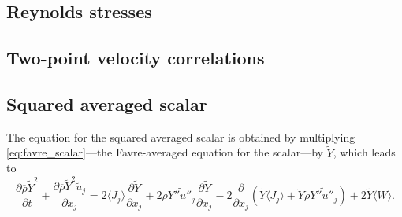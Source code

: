 \documentclass[oneside,a4paper,11pt]{report}
\newcommand{\rhoavg}{\overline{\rho}}
\newcommand{\uavgf}{\widetilde{u}}
\newcommand{\Yavgf}{\widetilde{Y}}
\newcommand{\Yflucf}{Y''}
\newcommand{\uflucf}{u''}
\begin{document}
\subsection{Reynolds stresses}

\subsection{Two-point velocity correlations}

\subsection{Squared averaged scalar}
The equation for the squared averaged scalar is obtained by multiplying \cref{eq:favre_scalar}---the Favre-averaged equation for the scalar---by $\Yavgf$, which leads to
\begin{equation}
    \label{eq:squared_averaged_scalar_favre}
    \frac{\partial \rhoavg \Yavgf^2}{\partial t} + \frac{\partial \rhoavg \Yavgf^2 \uavgf_j}{\partial x_j} = 2 \langle J_j \rangle \frac{\partial \Yavgf}{\partial x_j} + 2 \rhoavg \widetilde{\Yflucf \uflucf_j} \frac{\partial \Yavgf}{\partial x_j} - 2\frac{\partial}{\partial x_j} \left ( \Yavgf \langle J_j \rangle + \Yavgf \rhoavg \widetilde{\Yflucf \uflucf_j} \right ) + 2 \Yavgf \langle W \rangle.
\end{equation}

\end{document}

